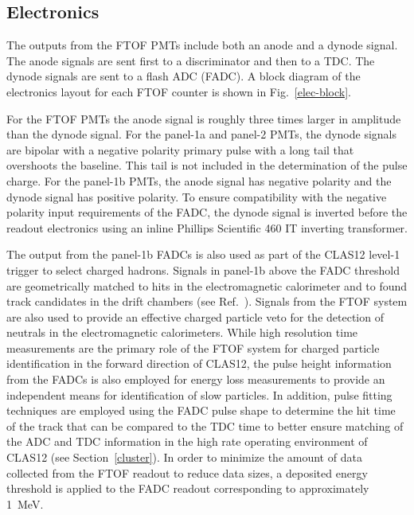 \documentclass{elsart}
\begin{document}
\subsection{Electronics}
\label{sec-elec}

The outputs from the FTOF PMTs include both an anode and a dynode signal. The anode signals are sent
first to a discriminator and then to a TDC. The dynode signals are sent to a flash ADC (FADC). A block
diagram of the electronics layout for each FTOF counter is shown in Fig.~\ref{elec-block}.

For the FTOF PMTs the anode signal is roughly three times larger in amplitude than the dynode signal.
For the panel-1a and panel-2 PMTs, the dynode signals are bipolar with a negative polarity primary pulse
with a long tail that overshoots the baseline. This tail is not included in the determination of the pulse
charge. For the panel-1b PMTs, the anode signal has negative polarity and the dynode signal has positive
polarity. To ensure compatibility with the negative polarity input requirements of the FADC, the dynode
signal is inverted before the readout electronics using an inline Phillips Scientific 460 IT inverting
transformer.

The output from the panel-1b FADCs is also used as part of the CLAS12 level-1 trigger to select charged
hadrons. Signals in panel-1b above the FADC threshold are geometrically matched to hits in the
electromagnetic calorimeter and to found track candidates in the drift chambers (see Ref.~\cite{trigger-nim}).
Signals from the FTOF system are also used to provide an effective charged particle veto for the detection of
neutrals in the electromagnetic calorimeters. While high resolution time measurements are the primary role of
the FTOF system for charged particle identification in the forward direction of CLAS12, the pulse height
information from the FADCs is also employed for energy loss measurements to provide an independent
means for identification of slow particles. In addition, pulse fitting techniques are employed using the
FADC pulse shape to determine the hit time of the track that can be compared to the TDC time to better
ensure matching of the ADC and TDC information in the high rate operating environment of CLAS12 (see
Section~\ref{cluster}). In order to minimize the amount of data collected from the FTOF readout to reduce
data sizes, a deposited energy threshold is applied to the FADC readout corresponding to approximately 1~MeV.
\end{document}
